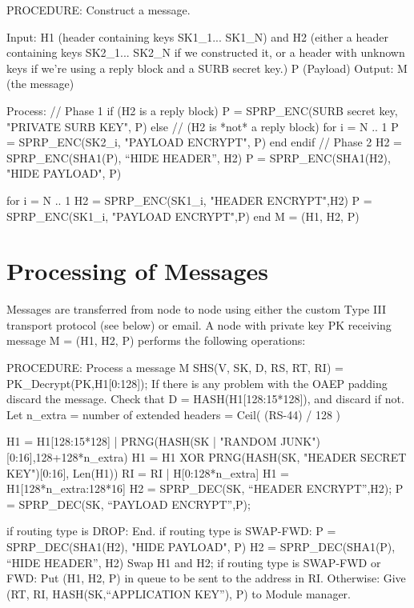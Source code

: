 PROCEDURE: Construct a message.

Input: H1 (header containing keys SK1_1... SK1_N)
       and H2 (either a header containing keys SK2_1... SK2_N if
         we constructed it, or a header with unknown keys if we're
         using a reply block and a SURB secret key.)
       P (Payload)
Output: M (the message)

Process:
        // Phase 1
        if (H2 is a reply block)
                P = SPRP_ENC(SURB secret key, "PRIVATE SURB KEY", P)
	else // (H2 is *not* a reply block)
		for i = N .. 1
	            P = SPRP_ENC(SK2_i, "PAYLOAD ENCRYPT", P)
		end
        endif
	// Phase 2
	H2 = SPRP_ENC(SHA1(P), ``HIDE HEADER'', H2)
        P = SPRP_ENC(SHA1(H2), "HIDE PAYLOAD", P)

	for i = N .. 1
		H2 = SPRP_ENC(SK1_i, "HEADER ENCRYPT",H2)
		P = SPRP_ENC(SK1_i, "PAYLOAD ENCRYPT",P)
	end
	M = (H1, H2, P)

\section{Processing of Messages}

Messages are transferred from node to node using either the custom Type
III transport protocol (see below) or email.  A node with private key
PK receiving message M = (H1, H2, P) performs the following operations:

PROCEDURE: Process a message M
	SHS(V, SK, D, RS, RT, RI) = PK_Decrypt(PK,H1[0:128]);
        If there is any problem with the OAEP padding discard the message.
        Check that D = HASH(H1[128:15*128]), and discard if not.
        Let n_extra = number of extended headers = Ceil( (RS-44) / 128 )
                  
        H1 = H1[128:15*128] | PRNG(HASH(SK | "RANDOM 
                                               JUNK")[0:16],128+128*n_extra)
	H1 = H1 XOR PRNG(HASH(SK, "HEADER SECRET KEY")[0:16], Len(H1))
        RI = RI | H[0:128*n_extra]
        H1 = H1[128*n_extra:128*16]
	H2 = SPRP_DEC(SK, ``HEADER ENCRYPT'',H2);
	P = SPRP_DEC(SK, ``PAYLOAD ENCRYPT'',P);

	if routing type is DROP:
                End.
	if routing type is SWAP-FWD:
                P = SPRP_DEC(SHA1(H2), "HIDE PAYLOAD", P)
		H2 = SPRP_DEC(SHA1(P), ``HIDE HEADER'', H2)
		Swap H1 and H2;
        if routing type is SWAP-FWD or FWD:
	   	Put (H1, H2, P) in queue to be sent to the address in RI.
        Otherwise:
		Give (RT, RI, HASH(SK,``APPLICATION KEY''), P) to
		Module manager. 

